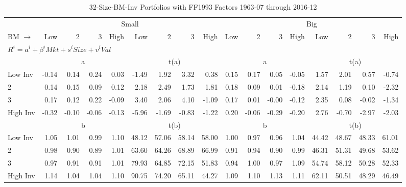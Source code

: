 
\begin{table}[!ht]
\centering
\caption{32-Size-BM-Inv Portfolios with FF1993 Factors 1963-07 through 2016-12}
\begin{tabular}{lrrrrrrrrrrrrrrrr}
  \toprule
    & \multicolumn{8}{c}{Small} & \multicolumn{8}{c}{Big} \\
      \cmidrule(r){2-9} \cmidrule(r){10-17}
    BM $\rightarrow$ & Low & 2 & 3 & High & Low & 2 & 3 & High & Low & 2 & 3 & High & Low & 2 & 3 & High \\ 
  \midrule
  \multicolumn{17}{l}{$R^i=a^i+\beta^iMkt+s^iSize+v^iVal$} \\

  
    
      & \multicolumn{4}{c}{a} & \multicolumn{4}{c}{t(a)}
    
      & \multicolumn{4}{c}{a} & \multicolumn{4}{c}{t(a)}
    
    \\
      \cmidrule(r){2-5} \cmidrule(r){6-9} \cmidrule(r){10-13} \cmidrule(r){14-17}

    Low Inv   & -0.14  & 0.14  & 0.24  & 0.03  & -1.49  & 1.92  & 3.32  & 0.38  & 0.15  & 0.17  & 0.05  & -0.05  & 1.57  & 2.01  & 0.57  & -0.74  \\
           2  & 0.14  & 0.15  & 0.09  & 0.12  & 2.18  & 2.49  & 1.73  & 1.81  & 0.18  & 0.09  & 0.01  & -0.18  & 2.14  & 1.19  & 0.10  & -2.32  \\
           3  & 0.17  & 0.12  & 0.22  & -0.09  & 3.40  & 2.06  & 4.10  & -1.09  & 0.17  & 0.01  & -0.00  & -0.12  & 2.35  & 0.08  & -0.02  & -1.34  \\
    High Inv  & -0.32  & -0.10  & -0.06  & -0.13  & -5.96  & -1.69  & -0.83  & -1.22  & 0.20  & -0.06  & -0.29  & -0.20  & 2.76  & -0.70  & -2.97  & -2.03  \\

  
    
      & \multicolumn{4}{c}{b} & \multicolumn{4}{c}{t(b)}
    
      & \multicolumn{4}{c}{b} & \multicolumn{4}{c}{t(b)}
    
    \\
      \cmidrule(r){2-5} \cmidrule(r){6-9} \cmidrule(r){10-13} \cmidrule(r){14-17}

    Low Inv   & 1.05  & 1.01  & 0.99  & 1.10  & 48.12  & 57.06  & 58.14  & 58.00  & 1.00  & 0.97  & 0.96  & 1.04  & 44.42  & 48.67  & 48.33  & 61.01  \\
           2  & 0.98  & 0.90  & 0.89  & 1.01  & 63.60  & 64.26  & 68.89  & 66.99  & 0.91  & 0.94  & 0.90  & 0.99  & 46.31  & 51.31  & 49.68  & 53.62  \\
           3  & 0.97  & 0.91  & 0.91  & 1.01  & 79.93  & 64.85  & 72.15  & 51.83  & 0.94  & 1.00  & 0.97  & 1.09  & 54.74  & 58.12  & 50.28  & 52.33  \\
    High Inv  & 1.14  & 1.04  & 1.04  & 1.10  & 90.75  & 74.20  & 65.11  & 44.27  & 1.09  & 1.10  & 1.13  & 1.11  & 62.11  & 50.51  & 48.29  & 46.49  \\


\end{tabular}
\end{table}
